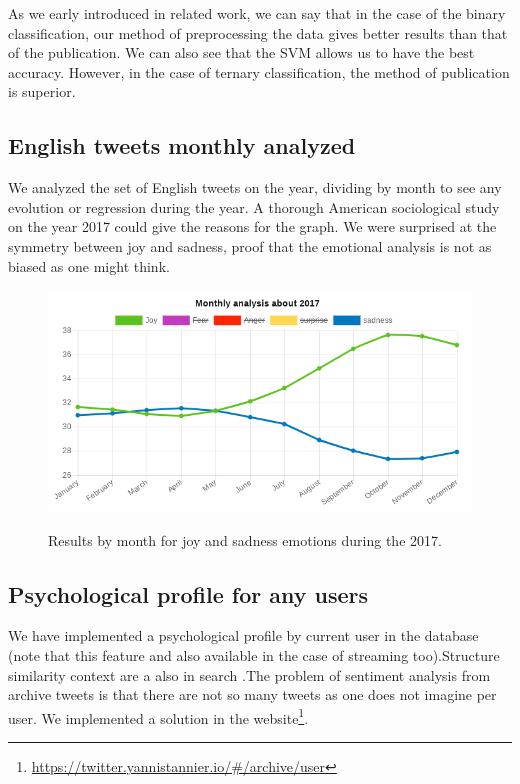 \documentclass{acmtog} %
\begin{document}
\begin{itemize}
As we early introduced in related work, we can say that in the case of the binary classification, our method of preprocessing the data gives better results than that of the publication.
We can also see that the SVM allows us to have the best accuracy.
However, in the case of ternary classification, the method of publication is superior.


\subsection{English tweets monthly analyzed}
\label{subsub:english_tweets_monthly}

We analyzed the set of English tweets on the year, dividing by month to see any evolution or regression during the year. A thorough American sociological study on the year 2017 could give the reasons for the graph. We were surprised at the symmetry between joy and sadness, proof that the emotional analysis is not as biased as one might think. 


\begin{figure}[H]
{\includegraphics[width=\linewidth]{monthly_analysis_joy_sadness-exemple.png}}
\caption{Results by month for joy and sadness emotions during the 2017.}
  \label{fig:trump_results}
\end{figure}




\subsection{Psychological profile for any users}
\label{subsub:psychological_profile}

We have implemented a psychological profile by current user in the database (note that this feature and also available in the case of streaming too).Structure similarity context are a also in search \cite{Zou18}.The problem of sentiment analysis from archive tweets is that there are not so many tweets as one does not imagine per user.
We implemented a solution in the website\footnote{\url{https://twitter.yannistannier.io/#/archive/user}}.



\end{itemize}
\end{document}
